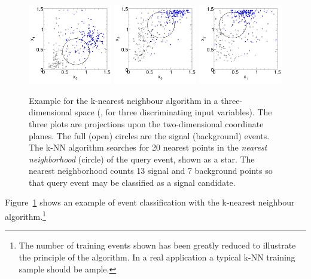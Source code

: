 \begin{figure}[t]
  \begin{center}
    \includegraphics[width=0.325\textwidth]{plots/knn_3d_s13_b7_x01}
    \includegraphics[width=0.325\textwidth]{plots/knn_3d_s13_b7_x02}
    \includegraphics[width=0.325\textwidth]{plots/knn_3d_s13_b7_x12}
  \end{center}
  \vspace{-0.7cm}
  \caption[.] { Example for the k-nearest neighbour algorithm in a three-dimensional space
                (\ie, for three discriminating input variables). The three plots are 
                projections upon the two-dimensional coordinate planes. The full (open) circles 
                are the signal (background) events. The k-NN algorithm searches for 20 nearest 
                points in the {\em nearest neighborhood} (circle) of the query event, shown as 
                a star. The nearest neighborhood counts 13 signal and 7 background points 
                so that query event may be classified as a signal candidate. }
\label{fig:knn-3d} 
\end{figure}
Figure~\ref{fig:knn-3d} shows an example of event classification with the k-nearest 
neighbour algorithm.\footnote
{
  The number of training events shown has been greatly reduced to illustrate the 
  principle of the algorithm. In a real application a typical k-NN training sample 
  should be ample.
}

